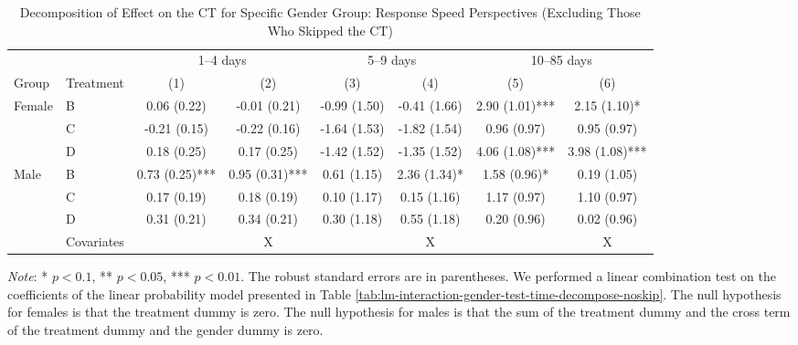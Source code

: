 \documentclass[12pt, a4paper]{article}
\begin{document}
\begin{table}[H]

\caption{\label{tab:lh-interaction-gender-test-time-decompose-noskip}Decomposition of Effect on the CT for Specific Gender Group: Response Speed Perspectives (Excluding Those Who Skipped the CT)}
\centering
\fontsize{8}{10}\selectfont
\begin{threeparttable}
\begin{tabular}[t]{llcccccc}
\toprule
\multicolumn{2}{c}{ } & \multicolumn{2}{c}{1--4 days} & \multicolumn{2}{c}{5--9 days} & \multicolumn{2}{c}{10--85 days} \\
\cmidrule(l{3pt}r{3pt}){3-4} \cmidrule(l{3pt}r{3pt}){5-6} \cmidrule(l{3pt}r{3pt}){7-8}
Group & Treatment & (1) & (2) & (3) & (4) & (5) & (6)\\
\midrule
Female & B & 0.06 (0.22) & -0.01 (0.21) & -0.99 (1.50) & -0.41 (1.66) & 2.90 (1.01)*** & 2.15 (1.10)*\\
 & C & -0.21 (0.15) & -0.22 (0.16) & -1.64 (1.53) & -1.82 (1.54) & 0.96 (0.97) & 0.95 (0.97)\\
 & D & 0.18 (0.25) & 0.17 (0.25) & -1.42 (1.52) & -1.35 (1.52) & 4.06 (1.08)*** & 3.98 (1.08)***\\
Male & B & 0.73 (0.25)*** & 0.95 (0.31)*** & 0.61 (1.15) & 2.36 (1.34)* & 1.58 (0.96)* & 0.19 (1.05)\\
 & C & 0.17 (0.19) & 0.18 (0.19) & 0.10 (1.17) & 0.15 (1.16) & 1.17 (0.97) & 1.10 (0.97)\\
 & D & 0.31 (0.21) & 0.34 (0.21) & 0.30 (1.18) & 0.55 (1.18) & 0.20 (0.96) & 0.02 (0.96)\\
\midrule
 & Covariates &  & X &  & X &  & X\\
\bottomrule
\end{tabular}
\begin{tablenotes}
\item \emph{Note}: * $p < 0.1$, ** $p < 0.05$, *** $p < 0.01$. The robust standard errors are in parentheses. We performed a linear combination test on the coefficients of the linear probability model presented in Table \ref{tab:lm-interaction-gender-test-time-decompose-noskip}. The null hypothesis for females is that the treatment dummy is zero. The null hypothesis for males is that the sum of the treatment dummy and the cross term of the treatment dummy and the gender dummy is zero.
\end{tablenotes}
\end{threeparttable}
\end{table}
\end{document}
